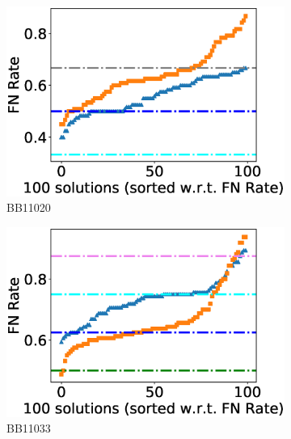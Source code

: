 \begin{figure}[!htbp]
\begin{adjustwidth}{-1cm}{-1cm}
		\begin{subfigure}[b]{0.26\textwidth}
			\includegraphics[width=\columnwidth]{Figure/summary/precomputedInit/Balibase/BB11020_fnrate_density_single_run}
			\caption{BB11020}
\end{subfigure}
		\begin{subfigure}[b]{0.26\textwidth}
			\includegraphics[width=\columnwidth]{Figure/summary/precomputedInit/Balibase/BB11033_fnrate_density_single_run}
			\caption{BB11033}
\end{subfigure}
\begin{subfigure}{0.26\textwidth}

\end{subfigure}
\end{adjustwidth}
\end{figure}

